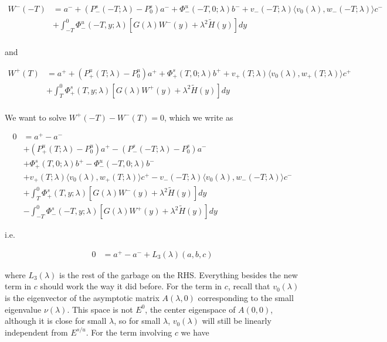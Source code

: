 \documentclass[12pt]{article}
\begin{document}
\begin{enumerate}
\begin{align*}
W^-(-T) &= a^- + (P^s_-(-T; \lambda) - P_0^s)a^- + \Phi^u_-(-T, 0; \lambda)b^- + v_-(-T; \lambda) \langle v_0(\lambda), w_-(-T; \lambda) \rangle c^-\\
&+ \int_{-T}^0 \Phi^u_-(-T, y; \lambda)[ G(\lambda)W^-(y) + \lambda^2 \tilde{H}(y) ] dy \\
\end{align*}

and

\begin{align*}
W^+(T) &= a^+ + (P^u_+(T; \lambda) - P_0^u)a^+ + \Phi^s_+(T, 0; \lambda)b^+ + v_+(T; \lambda) \langle v_0(\lambda), w_+(T; \lambda) \rangle c^+ \\
&+ \int_T^0 \Phi^s_+(T, y; \lambda) [ G(\lambda)W^+(y) + \lambda^2 \tilde{H}(y) ] dy \\
\end{align*}

We want to solve $W^+(-T) - W^-(T) = 0$, which we write as

\begin{align*}
0 &= a^+ - a^- \\
&+ (P^u_+(T; \lambda) - P_0^u)a^+ - (P^s_-(-T; \lambda) - P_0^s)a^- \\
&+ \Phi^s_+(T, 0; \lambda)b^+ - \Phi^u_-(-T, 0; \lambda)b^- \\
&+ v_+(T; \lambda) \langle v_0(\lambda), w_+(T; \lambda) \rangle c^+ - v_-(-T; \lambda) \langle v_0(\lambda), w_-(-T; \lambda) \rangle c^- \\
&+ \int_{T}^0 \Phi^s_+(T, y; \lambda) [ G(\lambda)W^-(y) + \lambda^2 \tilde{H}(y) ] dy \\
&- \int_{-T}^0 \Phi^s_-(-T, y; \lambda) [ G(\lambda)W^+(y) + \lambda^2 \tilde{H}(y) ] dy
\end{align*}

i.e. 

\begin{align*}
0 &= a^+ - a^- + L_3(\lambda)(a, b, c)
\end{align*}

where $L_3(\lambda)$ is the rest of the garbage on the RHS. Everything besides the new term in $c$ should work the way it did before. For the term in $c$, recall that $v_0(\lambda)$ is the eigenvector of the asymptotic matrix $A(\lambda, 0)$ corresponding to the small eigenvalue $\nu(\lambda)$. This space is not $E^0$, the center eigenspace of $A(0, 0)$, although it is close for small $\lambda$, so for small $\lambda$, $v_0(\lambda)$ will still be linearly independent from $E^{s/u}$. For the term involving $c$ we have 


\end{enumerate}
\end{document}
